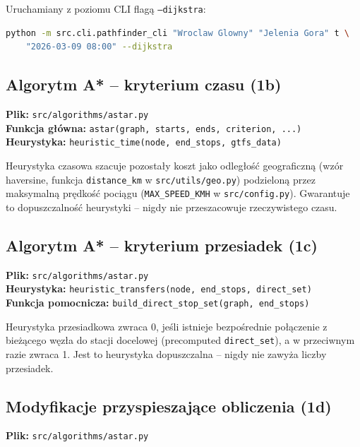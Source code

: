 \documentclass[12pt,a4paper]{article}
\begin{document}
Uruchamiany z poziomu CLI flagą \texttt{--dijkstra}:
\begin{lstlisting}[language=bash]
python -m src.cli.pathfinder_cli "Wroclaw Glowny" "Jelenia Gora" t \
    "2026-03-09 08:00" --dijkstra
\end{lstlisting}

\subsection{Algorytm A* -- kryterium czasu (1b)}

\textbf{Plik:} \texttt{src/algorithms/astar.py}\\
\textbf{Funkcja główna:} \texttt{astar(graph, starts, ends, criterion, ...)}\\
\textbf{Heurystyka:} \texttt{heuristic\_time(node, end\_stops, gtfs\_data)}

Heurystyka czasowa szacuje pozostały koszt jako odległość geograficzną (wzór haversine,
funkcja \texttt{distance\_km} w \texttt{src/utils/geo.py}) podzieloną przez maksymalną
prędkość pociągu (\texttt{MAX\_SPEED\_KMH} w \texttt{src/config.py}).
Gwarantuje to dopuszczalność heurystyki -- nigdy nie przeszacowuje rzeczywistego czasu.

\subsection{Algorytm A* -- kryterium przesiadek (1c)}

\textbf{Plik:} \texttt{src/algorithms/astar.py}\\
\textbf{Heurystyka:} \texttt{heuristic\_transfers(node, end\_stops, direct\_set)}\\
\textbf{Funkcja pomocnicza:} \texttt{build\_direct\_stop\_set(graph, end\_stops)}

Heurystyka przesiadkowa zwraca 0, jeśli istnieje bezpośrednie połączenie z bieżącego
węzła do stacji docelowej (precomputed \texttt{direct\_set}), a w przeciwnym razie
zwraca 1. Jest to heurystyka dopuszczalna -- nigdy nie zawyża liczby przesiadek.

\subsection{Modyfikacje przyspieszające obliczenia (1d)}

\textbf{Plik:} \texttt{src/algorithms/astar.py}
\end{document}
